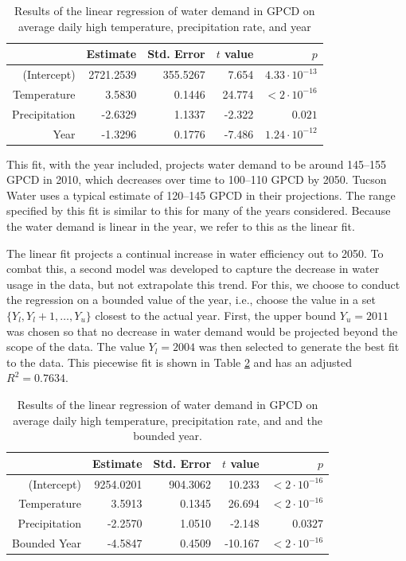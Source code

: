 \documentclass[11pt]{article}
\theoremstyle{plain}
\theoremstyle{definition}
\theoremstyle{remark}
\begin{document}
\begin{table}
	\centering
	\begin{tabular}{rrrrr}
		\hline
						   & Estimate  & Std. Error & $t$ value & $p$ \\
		\hline
		(Intercept)    & 2721.2539 & 355.5267   & 7.654     & $4.33\cdot 10^{-13}$ \\
		Temperature    &   3.5830  & 0.1446     & 24.774    & $< 2\cdot 10^{-16}$\\
		Precipitation  &  -2.6329  & 1.1337     & -2.322    & $0.021$ \\
		Year           &  -1.3296  & 0.1776     & -7.486    & $1.24\cdot 10^{-12}$ \\
		\hline
	\end{tabular}
	\caption{
		Results of the linear regression of water demand in GPCD on average daily high temperature, precipitation rate, and year
	}
	\label{tb:gpcd_linear_reg}
\end{table}

This fit, with the year included, projects water demand to be around 145--155 GPCD in 2010, which decreases over time to 100--110 GPCD by 2050.
Tucson Water uses a typical estimate of 120--145 GPCD in their projections.
The range specified by this fit is similar to this for many of the years considered.
Because the water demand is linear in the year, we refer to this as the linear fit.

The linear fit projects a continual increase in water efficiency out to 2050.
To combat this, a second model was developed to capture the decrease in water usage in the data, but not extrapolate this trend.
For this, we choose to conduct the regression on a bounded value of the year, i.e., choose the value in a set $\{Y_l, Y_l+1, \dots, Y_u\}$ closest to the actual year.
First, the upper bound $Y_u = 2011$ was chosen so that no decrease in water demand would be projected beyond the scope of the data.
The value $Y_l = 2004$ was then selected to generate the best fit to the data.
This piecewise fit is shown in Table \ref{tb:gpcd_piecewise_reg} and has an adjusted $R^2 = 0.7634$.

\begin{table}
	\centering
	\begin{tabular}{rrrrr}
		\hline
						   & Estimate  & Std. Error & $t$ value & $p$ \\
		\hline
		(Intercept)    & 9254.0201 & 904.3062   & 10.233    & $<2\cdot 10^{-16}$ \\
		Temperature    & 3.5913    & 0.1345     & 26.694    & $<2\cdot 10^{-16}$ \\
		Precipitation  & -2.2570   & 1.0510     & -2.148    & $0.0327$ \\
		Bounded Year   & -4.5847   & 0.4509     & -10.167   & $<2\cdot 10^{-16}$ \\
		\hline
	\end{tabular}
	\caption{
		Results of the linear regression of water demand in GPCD on average daily high temperature, precipitation rate, and and the bounded year.
	}
	\label{tb:gpcd_piecewise_reg}
\end{table}
\end{document}
